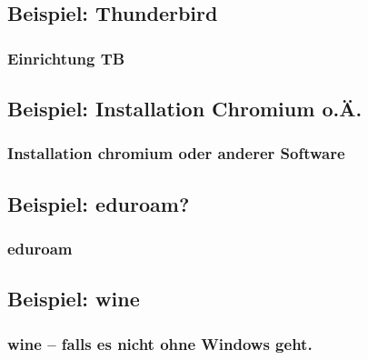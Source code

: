 \documentclass{beamer}
\begin{document}
        \subsection{Beispiel: Thunderbird}
            \begin{frame}
          		\frametitle{Einrichtung TB}
        		\begin{minipage}{0.44\textwidth}
        		
        		\end{minipage}%
        		\begin{minipage}{0.54\textwidth}
        		
        		\end{minipage}
        	\end{frame}
        	
        \subsection{Beispiel: Installation Chromium o.Ä.}
            \begin{frame}
          		\frametitle{Installation chromium oder anderer Software}
        		\begin{minipage}{0.44\textwidth}
        		
        		\end{minipage}%
        		\begin{minipage}{0.54\textwidth}
        		
        		\end{minipage}
        	\end{frame}
        
        \subsection{Beispiel: eduroam?}
            \begin{frame}
          		\frametitle{eduroam}
        		\begin{minipage}{0.44\textwidth}
        		
        		\end{minipage}%
        		\begin{minipage}{0.54\textwidth}
        		
        		\end{minipage}
        	\end{frame}
        	
        \subsection{Beispiel: wine}
            \begin{frame}
          		\frametitle{wine -- falls es nicht ohne Windows geht.}
        		\begin{minipage}{0.44\textwidth}
        		
        		\end{minipage}%
        		\begin{minipage}{0.54\textwidth}
        		
        		\end{minipage}
        	\end{frame}
        	
\end{document}
